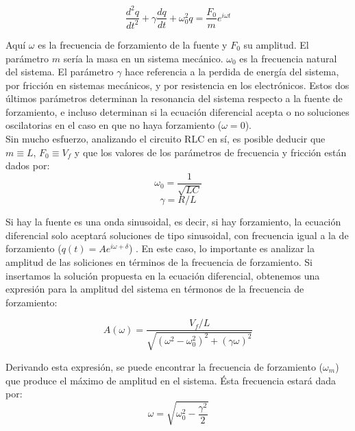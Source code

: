 \documentclass[%
 reprint,
 amsmath,amssymb,
 aps,
]{revtex4-1}
\begin{document}
\begin{equation}
\frac{d^2q}{dt^2} + \gamma\frac{dq}{dt} + \omega_0^2q = \frac{F_0}{m}e^{i\omega t}
\end{equation}

Aqu\'i $\omega$ es la frecuencia de forzamiento de la fuente y $F_0$ su amplitud. El par\'ametro $m$ ser\'ia la masa en un sistema mec\'anico. $\omega_0$ es la frecuencia natural del sistema. El par\'ametro $\gamma$ hace referencia a la perdida de energ\'ia del sistema, por fricci\'on en sistemas mec\'anicos, y por resistencia en los electr\'onicos. Estos dos \'ultimos par\'ametros determinan la resonancia del sistema respecto a la fuente de forzamiento, e incluso determinan si la ecuaci\'on diferencial acepta o no soluciones oscilatorias en el caso en que no haya forzamiento ($\omega = 0$).\\

Sin mucho esfuerzo, analizando el circuito RLC en s\'i, es posible deducir que $m \equiv L$, $F_0 \equiv V_f$ y que los valores de los par\'ametros de frecuencia y fricci\'on están dados por: \cite{ondas}\\

\begin{equation}
\omega_0 = \frac{1}{\sqrt{LC}}
\end{equation}
\begin{equation}
\gamma = R/L
\end{equation}

Si hay la fuente es una onda sinusoidal, es decir, si hay forzamiento, la ecuaci\'on diferencial solo aceptar\'a soluciones de tipo sinusoidal, con frecuencia igual a la de forzamiento ($q(t) = Ae^{i\omega + \delta}$) . En este caso, lo importante es analizar la amplitud de las soliciones en t\'erminos de la frecuencia de forzamiento. Si insertamos la soluci\'on propuesta en la ecuaci\'on diferencial, obtenemos una expresi\'on para la amplitud del sistema en t\'ermonos de la frecuencia de forzamiento: \cite{ondas}

\begin{equation}
A(\omega) = \frac{V_f/L}{\sqrt{(\omega^2 - \omega_0^2)^2 + (\gamma\omega)^2}}
\label{equation:amplitud}
\end{equation}

Derivando esta expresi\'on, se puede encontrar la frecuencia de forzamiento ($\omega_m$) que produce el m\'aximo de amplitud en el sistema. \'Esta frecuencia estar\'a dada por:\\

\begin{equation}
\omega = \sqrt{\omega_0^2 - \frac{\gamma^2}{2} }
\end{equation}
\end{document}
